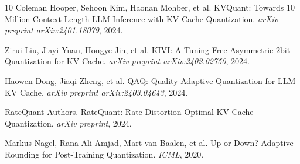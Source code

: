 \documentclass[11pt,a4paper]{article}
\begin{document}



\begin{thebibliography}{10}
Coleman Hooper, Sehoon Kim, Haonan Mohber, et al.
\newblock KVQuant: Towards 10 Million Context Length LLM Inference with KV Cache Quantization.
\newblock \emph{arXiv preprint arXiv:2401.18079}, 2024.

Zirui Liu, Jiayi Yuan, Hongye Jin, et al.
\newblock KIVI: A Tuning-Free Asymmetric 2bit Quantization for KV Cache.
\newblock \emph{arXiv preprint arXiv:2402.02750}, 2024.

Haowen Dong, Jiaqi Zheng, et al.
\newblock QAQ: Quality Adaptive Quantization for LLM KV Cache.
\newblock \emph{arXiv preprint arXiv:2403.04643}, 2024.

RateQuant Authors.
\newblock RateQuant: Rate-Distortion Optimal KV Cache Quantization.
\newblock \emph{arXiv preprint}, 2024.

Markus Nagel, Rana Ali Amjad, Mart van Baalen, et al.
\newblock Up or Down? Adaptive Rounding for Post-Training Quantization.
\newblock \emph{ICML}, 2020.
\end{thebibliography}
\end{document}
